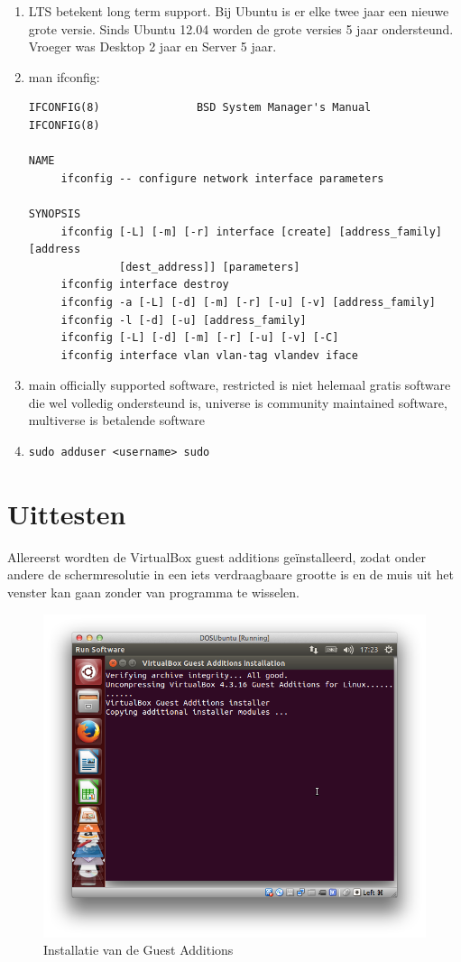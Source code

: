 \documentclass[11pt, a4paper]{article}
\begin{document}
\begin{enumerate}
\item LTS betekent long term support. Bij Ubuntu is er elke twee jaar een nieuwe grote versie. Sinds Ubuntu 12.04 worden de grote versies 5 jaar ondersteund. Vroeger was Desktop 2 jaar en Server 5 jaar.
\item man ifconfig: 
	\begin{verbatim}IFCONFIG(8)               BSD System Manager's Manual              IFCONFIG(8)

NAME
     ifconfig -- configure network interface parameters

SYNOPSIS
     ifconfig [-L] [-m] [-r] interface [create] [address_family] [address
              [dest_address]] [parameters]
     ifconfig interface destroy
     ifconfig -a [-L] [-d] [-m] [-r] [-u] [-v] [address_family]
     ifconfig -l [-d] [-u] [address_family]
     ifconfig [-L] [-d] [-m] [-r] [-u] [-v] [-C]
     ifconfig interface vlan vlan-tag vlandev iface
	\end{verbatim}
\item main officially supported software, restricted is niet helemaal gratis software die wel volledig ondersteund is, universe is community maintained software, multiverse is betalende software
\item \begin{verbatim}sudo adduser <username> sudo\end{verbatim}
\end{enumerate}

\section{Uittesten}

Allereerst wordten de VirtualBox guest additions ge\"installeerd, zodat onder andere de schermresolutie in een iets verdraagbaare grootte is en de muis uit het venster kan gaan zonder van programma te wisselen. 

\begin{figure}[H]
	\centering
	\includegraphics[width=\textwidth]{./IMG/Z}
	\caption{Installatie van de Guest Additions}
\end{figure}
\end{document}
